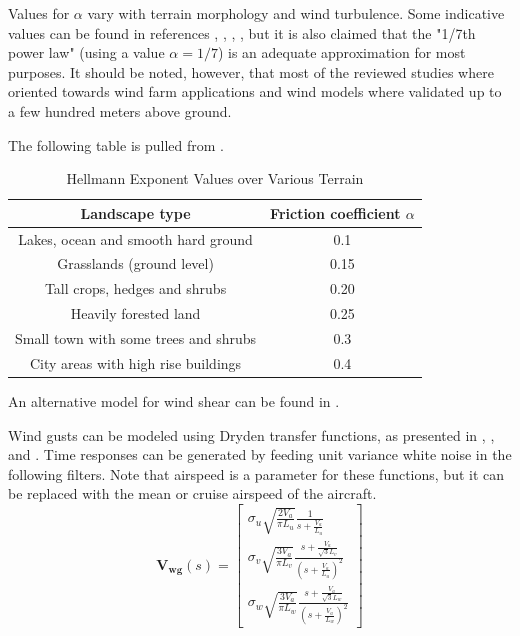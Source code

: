 Values for $\alpha$ vary with terrain morphology and wind turbulence. Some indicative values can be found in references \cite{Banuelos-Ruedas2011}, \cite{Peterson1978}, \cite{wiki:WindGrad}, \cite{wiki:Wind_profile_power_law}, but it is also claimed that the "1/7th power law" (using a value $\alpha=1/7$) is an adequate approximation for most purposes.
It should be noted, however, that most of the reviewed studies where oriented towards wind farm applications and wind models where validated up to a few hundred meters above ground.

The following table is pulled from \cite{Banuelos-Ruedas2011}.

\begin{table}[H]
\centering
\begin{tabular}{|c|c|}
	\hline
	           Landscape type             & Friction coefficient $\alpha$ \\ \hline
	 Lakes, ocean and smooth hard ground  &              0.1              \\ \hline
	      Grasslands (ground level)       &             0.15              \\ \hline
	    Tall crops, hedges and shrubs     &             0.20              \\ \hline
	        Heavily forested land         &             0.25              \\ \hline
	Small town with some trees and shrubs &              0.3              \\ \hline
	 City areas with high rise buildings  &              0.4              \\ \hline
\end{tabular} 
\caption{Hellmann Exponent Values over Various Terrain}
\end{table}

An alternative model for wind shear can be found in \cite{Moorhouse1982}.

Wind gusts can be modeled using Dryden transfer functions, as presented in \cite{Moorhouse1982}, \cite{BEAL1993}, \cite{MathWorks:DrydenTurbulence} and \cite{Beard2012} . Time responses can be generated by feeding unit variance white noise in the following filters. Note that airspeed is a parameter for these functions, but it can be replaced with the mean or cruise airspeed of the aircraft.
\begin{equation}
	\bm{V_{wg}}(s) =
	\begin{bmatrix}
		\sigma_u \sqrt{\frac{2V_a}{\pi L_u}} \frac{1}{s + \frac{V_a}{L_u}}\\
		\sigma_v \sqrt{\frac{3V_a}{\pi L_v}} \frac{s+\frac{V_a}{\sqrt{3}L_v}}{(s+\frac{V_a}{L_u})^2} \\
		\sigma_w \sqrt{\frac{3V_a}{\pi L_w}} \frac{s+\frac{V_a}{\sqrt{3}L_w}}{(s+\frac{V_a}{L_w})^2}
	\end{bmatrix}
\end{equation}

